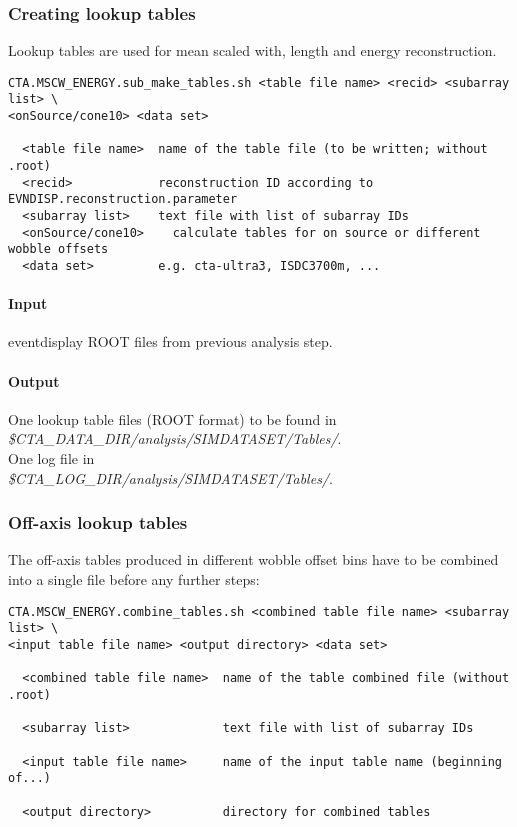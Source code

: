 \documentclass[titlepage,a4paper,twoside,11pt]{report}
\begin{document}
\subsubsection{Creating lookup tables}

Lookup tables are used for mean scaled with, length and energy reconstruction.

\begin{lstlisting}
CTA.MSCW_ENERGY.sub_make_tables.sh <table file name> <recid> <subarray list> \
<onSource/cone10> <data set>

  <table file name>  name of the table file (to be written; without .root)
  <recid>            reconstruction ID according to EVNDISP.reconstruction.parameter
  <subarray list>    text file with list of subarray IDs
  <onSource/cone10>    calculate tables for on source or different wobble offsets
  <data set>         e.g. cta-ultra3, ISDC3700m, ... 
\end{lstlisting}

\paragraph{Input}
eventdisplay ROOT files from previous analysis step.

\paragraph{Output}

One lookup table files (ROOT format) to be found in \\
{\it \$CTA\_DATA\_DIR/analysis/SIMDATASET/Tables/}. \\
One log file in \\
{\it \$CTA\_LOG\_DIR/analysis/SIMDATASET/Tables/}.

\subsubsection{Off-axis lookup tables}

The off-axis tables produced in different wobble offset bins have to be combined into a single file before any further steps:

\begin{lstlisting}
CTA.MSCW_ENERGY.combine_tables.sh <combined table file name> <subarray list> \
<input table file name> <output directory> <data set> 

  <combined table file name>  name of the table combined file (without .root)

  <subarray list>             text file with list of subarray IDs

  <input table file name>     name of the input table name (beginning of...)

  <output directory>          directory for combined tables
\end{lstlisting}
\end{document}
